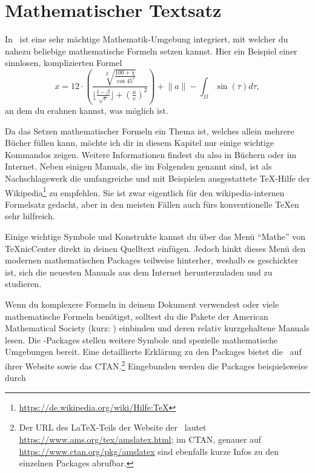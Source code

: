 %
%
\chapter{Mathematischer Textsatz}

In \DMLLaTeX \ ist eine sehr mächtige Mathematik-Umgebung integriert, mit welcher du nahezu beliebige mathematische Formeln setzen kannst. Hier ein Beispiel einer sinnlosen, komplizierten Formel
\begin{equation}
	x = 12 \cdot \left( \frac{
		\sqrt[g]{ \frac{ 100 + \chi }{ \cos 45^{f} } }
	}{
		\lfloor \frac{ t - \beta }{ \sqrt{ r } } \rfloor
		+ \left( \frac uv \right)^2
	} \right) + \lVert a\rVert - \int_\Omega \sin(\tau) d\tau,
\end{equation}
an dem du erahnen kannst, was möglich ist.

Da das Setzen mathematischer Formeln ein Thema ist, welches allein mehrere Bücher füllen kann, möchte ich dir in diesem Kapitel nur einige wichtige Kommandos zeigen. Weitere Informationen findest du also in Büchern oder im Internet. Neben einigen Manuals, die im Folgenden genannt sind, ist als Nachschlagewerk die umfangreiche und mit Beispielen ausgestattete \TeX-Hilfe der Wikipedia\footnote{\href{https://de.wikipedia.org/wiki/Hilfe:TeX}{https://de.wikipedia.org/wiki/Hilfe:TeX}} zu empfehlen. Sie ist zwar eigentlich für den wikipedia-internen Formelsatz gedacht, aber in den meisten Fällen auch fürs konventionelle \TeX{}en sehr hilfreich.

Einige wichtige Symbole und Konstrukte kannst du über das Menü \enquote{Mathe} von TeXnicCenter direkt in deinen Quelltext einfügen. Jedoch hinkt dieses Menü den modernen mathematischen Packages teilweise hinterher, weshalb es geschickter ist, sich die neuesten Manuals aus dem Internet herunterzuladen und zu studieren.

Wenn du komplexere Formeln in deinem Dokument verwendest oder viele mathematische Formeln benötigst, solltest du die Pakete der American Mathematical Society (kurz: \AmS) einbinden und deren relativ kurzgehaltene Manuals lesen. Die \AmSmath-Packages stellen weitere Symbole und spezielle mathematische Umgebungen bereit. Eine detaillierte Erklärung zu den Packages bietet die \AmS\ auf ihrer Website sowie das CTAN.\footnote{Der URL des {\rmfamily\LaTeX}-Teils der Website der \AmS\ lautet \href{https://www.ams.org/tex/amslatex.html}{https://www.ams.org/tex/amslatex.html}; im CTAN, genauer auf \href{https://www.ctan.org/pkg/amslatex}{https://www.ctan.org/pkg/amslatex} sind ebenfalls kurze Infos zu den einzelnen Packages abrufbar.} Eingebunden werden die Packages beispielsweise durch

